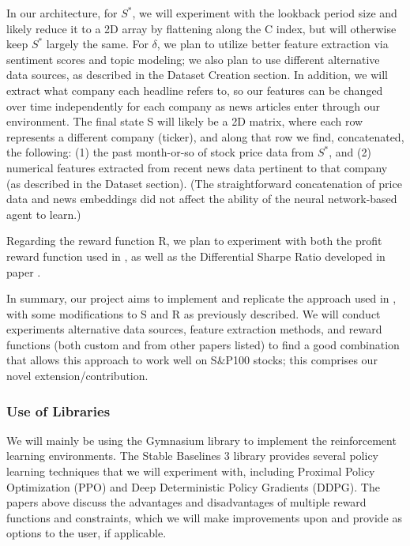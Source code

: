In our architecture, for $S^*$, we will experiment with the lookback period size and likely reduce it 
to a 2D array by flattening along the C index, but will otherwise keep $S^*$ largely the same. For 
$\delta$, we plan to utilize better feature extraction via sentiment scores and topic modeling; 
we also plan to use different alternative data sources, as described in the Dataset Creation section. 
In addition, we will extract what company each headline refers to, so our features can be changed 
over time independently for each company as news articles enter through our environment. The final 
state S will likely be a 2D matrix, where each row represents a different company (ticker), and along 
that row we find, concatenated, the following: (1) the past month-or-so of stock price data from $S^*$, 
and (2) numerical features extracted from recent news data pertinent to that company (as described 
in the Dataset section). (The straightforward concatenation of price data and news embeddings did not 
affect the ability of the neural network-based agent to learn.)

Regarding the reward function R, we plan to experiment with both the profit reward function used in \cite{rl_augmented_states}, 
as well as the Differential Sharpe Ratio developed in paper \cite{drl_mvo}.

In summary, our project aims to implement and replicate the approach used in \cite{rl_augmented_states}, with 
some modifications to S and R as previously described. We will conduct experiments alternative data 
sources, feature extraction methods, and reward functions (both custom and from other papers listed) 
to find a good combination that allows this approach to work well on S$\&$P100 stocks; this comprises our 
novel extension/contribution.

\subsubsection{Use of Libraries}

We will mainly be using the Gymnasium library to implement the reinforcement learning environments. 
The Stable Baselines 3 library provides several policy learning techniques that we will experiment with, 
including Proximal Policy Optimization (PPO) and Deep Deterministic Policy Gradients (DDPG). 
The papers above discuss the advantages and disadvantages of multiple reward functions and constraints, 
which we will make improvements upon and provide as options to the user, if applicable.

